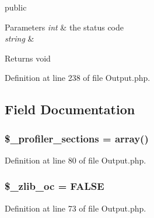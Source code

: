 public 
\begin{DoxyParams}{Parameters}
{\em int} & the status code \\
\hline
{\em string} & \\
\hline
\end{DoxyParams}
\begin{DoxyReturn}{Returns}
void 
\end{DoxyReturn}


Definition at line 238 of file Output.\+php.



\subsection{Field Documentation}
\subsubsection[{\texorpdfstring{\$\+\_\+profiler\+\_\+sections}{$_profiler_sections}}]{\setlength{\rightskip}{0pt plus 5cm}\$\+\_\+profiler\+\_\+sections = array()\hspace{0.3cm}{\ttfamily [protected]}}\hypertarget{class_c_i___output_a4d239124375bbbdb9a4f5a0260505c40}{}\label{class_c_i___output_a4d239124375bbbdb9a4f5a0260505c40}


Definition at line 80 of file Output.\+php.

\subsubsection[{\texorpdfstring{\$\+\_\+zlib\+\_\+oc}{$_zlib_oc}}]{\setlength{\rightskip}{0pt plus 5cm}\$\+\_\+zlib\+\_\+oc = F\+A\+L\+SE\hspace{0.3cm}{\ttfamily [protected]}}\hypertarget{class_c_i___output_a76d91b71069ec82a31b4d12643e0ca40}{}\label{class_c_i___output_a76d91b71069ec82a31b4d12643e0ca40}


Definition at line 73 of file Output.\+php.

